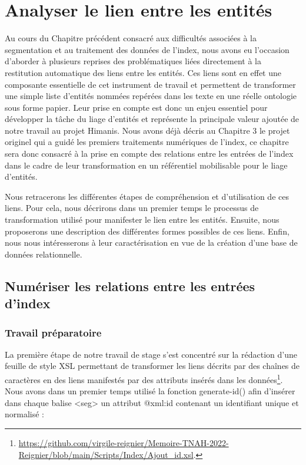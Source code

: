 \documentclass[a4paper,12pt,twoside]{book}
\begin{document}
	\chapter{Analyser le lien entre les entités}
	
	Au cours du Chapitre précédent consacré aux difficultés associées à la segmentation et au traitement des données de l'index, nous avons eu l'occasion d'aborder à plusieurs reprises des problématiques liées directement à la restitution automatique des liens entre les entités. Ces liens sont en effet une composante essentielle de cet instrument de travail et permettent de transformer une simple liste d'entités nommées repérées dans les texte en une réelle ontologie sous forme papier. Leur prise en compte est donc un enjeu essentiel pour développer la tâche du liage d'entités et représente la principale valeur ajoutée de notre travail au projet Himanis. Nous avons déjà décris au Chapitre 3 le projet originel qui a guidé les premiers traitements numériques de l'index, ce chapitre sera donc consacré à la prise en compte des relations entre les entrées de l'index dans le cadre de leur transformation en un référentiel mobilisable pour le liage d'entités.
	
	Nous retracerons les différentes étapes de compréhension et d'utilisation de ces liens. Pour cela, nous décrirons dans un premier temps le processus de transformation utilisé pour manifester le lien entre les entités. Ensuite, nous proposerons une description des différentes formes possibles de ces liens. Enfin, nous nous intéresserons à leur caractérisation en vue de la création d'une base de données relationnelle.
	
	
	\section{Numériser les relations entre les entrées d’index}
	
	\subsection{Travail préparatoire}
	
	La première étape de notre travail de stage s'est concentré sur la rédaction d'une feuille de style XSL permettant de transformer les liens décrits par des chaînes de caractères en des liens manifestés par des attributs insérés dans les données\footnote{\url{https://github.com/virgile-reignier/Memoire-TNAH-2022-Reignier/blob/main/Scripts/Index/Ajout_id.xsl}.}. Nous avons dans un premier temps utilisé la fonction \og generate-id()\fg{} afin d'insérer dans chaque balise <seg> un attribut @xml:id contenant un identifiant unique et normalisé :
	
\end{document}
